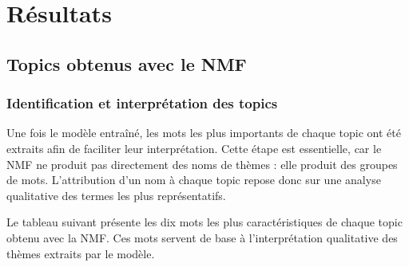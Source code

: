 \section{Résultats}

\subsection{Topics obtenus avec le NMF}
\subsubsection{Identification et interprétation des topics}

Une fois le modèle entraîné, les mots les plus importants de chaque topic ont été extraits afin de faciliter leur interprétation. Cette étape est essentielle, car le NMF ne produit pas directement des noms de thèmes : elle produit des groupes de mots. L'attribution d'un nom à chaque topic repose donc sur une analyse qualitative des termes les plus représentatifs.

Le tableau suivant présente les dix mots les plus caractéristiques de chaque topic obtenu avec la NMF. Ces mots servent de base à l'interprétation qualitative des thèmes extraits par le modèle.
\newpage

